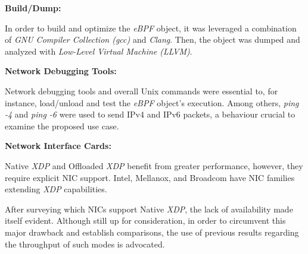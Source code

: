 \noindent \textbf{Build/Dump:}

In order to build and optimize the \textit{eBPF} object, it was leveraged a combination of \textit{GNU Compiler Collection (gcc)} and \textit{Clang}.
Then, the object was dumped and analyzed with \textit{Low-Level Virtual Machine (LLVM)}.

\noindent \textbf{Network Debugging Tools:}

Network debugging tools and overall Unix commands were essential to, for instance, load/unload and test the \textit{eBPF} object's execution.
Among others, \textit{ping -4} and \textit{ping -6} were used to send IPv4 and IPv6 packets, a behaviour crucial to examine the proposed use case.

\noindent \textbf{Network Interface Cards:}

Native \textit{XDP} and Offloaded \textit{XDP} benefit from greater performance, however, they require explicit NIC support.
Intel, Mellanox, and Broadcom have NIC families extending \textit{XDP} capabilities.

After surveying which NICs support Native \textit{XDP}, the lack of availability made itself evident.
Although still up for consideration, in order to circumvent this major drawback and establish comparisons, the use of previous results regarding the throughput of such modes is advocated.